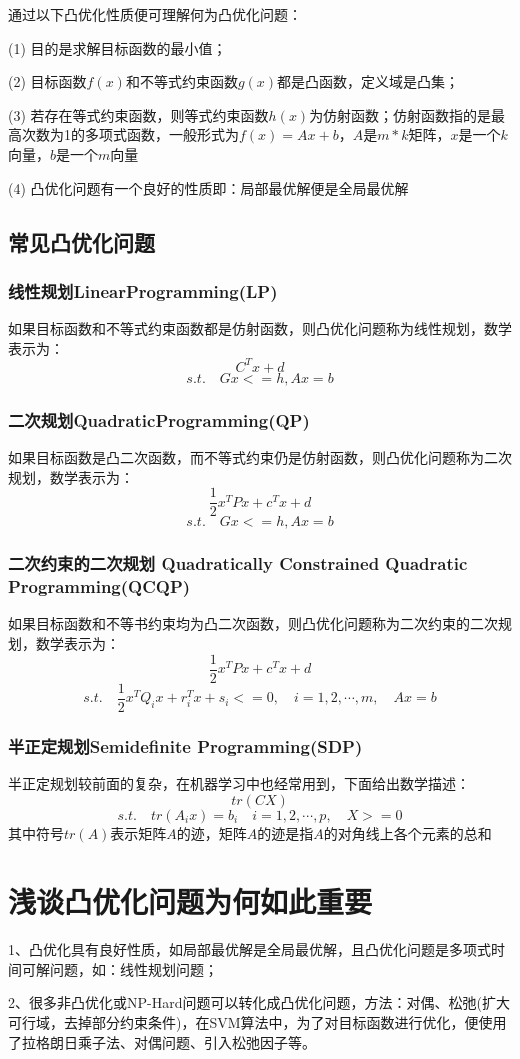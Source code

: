 \documentclass[12pt]{article}
\begin{document}
通过以下凸优化性质便可理解何为凸优化问题：

(1) 目的是求解目标函数的最小值；

(2) 目标函数$f(x)$和不等式约束函数$g(x)$都是凸函数，定义域是凸集；

(3) 若存在等式约束函数，则等式约束函数$h(x)$为仿射函数；仿射函数指的是最高次数为1的多项式函数，一般形式为$f(x)= Ax + b$，$A$是$m*k$矩阵，$x$是一个$k$向量，$b$是一个$m$向量

(4) 凸优化问题有一个良好的性质即：局部最优解便是全局最优解

\subsection{常见凸优化问题}
\subsubsection{线性规划LinearProgramming(LP)}
如果目标函数和不等式约束函数都是仿射函数，则凸优化问题称为线性规划，数学表示为：
$$
C^Tx + d
$$
$$
s.t.\quad Gx <= h, Ax = b
$$

\subsubsection{二次规划QuadraticProgramming(QP)}
如果目标函数是凸二次函数，而不等式约束仍是仿射函数，则凸优化问题称为二次规划，数学表示为：
$$
\frac{1}{2}x^TPx + c^Tx + d
$$
$$
s.t.\quad Gx <= h, Ax = b
$$

\subsubsection{ 二次约束的二次规划 Quadratically Constrained Quadratic Programming(QCQP)}
如果目标函数和不等书约束均为凸二次函数，则凸优化问题称为二次约束的二次规划，数学表示为：
$$
\frac{1}{2}x^TPx + c^Tx + d
$$
$$
s.t.\quad \frac{1}{2}x^TQ_ix + r_i^Tx + s_i <= 0, \quad i = 1, 2, \cdots, m, \quad Ax = b
$$

\subsubsection{半正定规划Semidefinite Programming(SDP)}
半正定规划较前面的复杂，在机器学习中也经常用到，下面给出数学描述：
$$
tr(CX)
$$
$$
s.t. \quad tr(A_ix) = b_i \quad i = 1, 2, \cdots, p, \quad X >= 0
$$
其中符号$tr(A)$表示矩阵$A$的迹，矩阵$A$的迹是指$A$的对角线上各个元素的总和

\section{浅谈凸优化问题为何如此重要}
1、凸优化具有良好性质，如局部最优解是全局最优解，且凸优化问题是多项式时间可解问题，如：线性规划问题；

2、很多非凸优化或NP-Hard问题可以转化成凸优化问题，方法：对偶、松弛(扩大可行域，去掉部分约束条件)，在SVM算法中，为了对目标函数进行优化，便使用了拉格朗日乘子法、对偶问题、引入松弛因子等。



\end{document}
